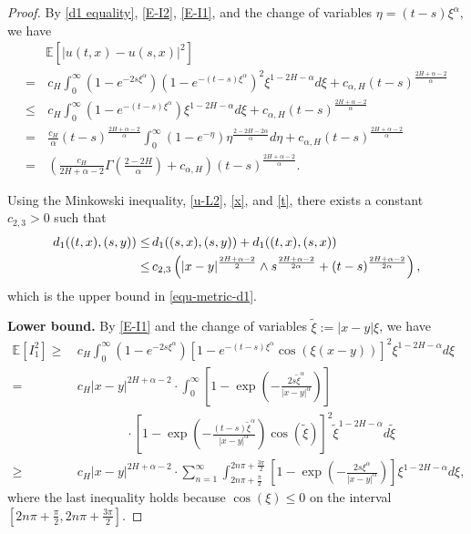 \documentclass[11pt,reqno]{amsart}
\numberwithin{equation}{section}
\def\EE{\mathbb{E}}
\newcommand{\1}{{\bf 1}}
\newcommand{\2}{{\bf 2}}
\newcommand{\lc}{\left(}
\newcommand{\rc}{\right)}
\newcommand{\lk}{\left[}
\newcommand{\rk}{\right]}
\begin{document}
\begin{proof}
By \eqref{d1 equality}, \eqref{E-I2}, \eqref{E-I1}, and
the change of variables $\eta=(t-s)\xi^\alpha$, we have
\begin{equation}\label{t}
\begin{split}
&\EE\left[\left|u(t,x)-u(s,x)\right|^2\right]\\
=&\, c_{H}\int_{0}^{\infty} \lc 1-e^{-2s\xi^{\alpha}}\rc
     \left(1-e^{-(t-s)\xi^{\alpha}}\right)^2   \xi^{1-2H-\alpha}d\xi
     +c_{\alpha, H}(t-s)^{\frac {2H+\alpha-2}{\alpha}} \\
\leq&\, c_{H}\int_{0}^{\infty}\left(1-e^{-(t-s)\xi^{\alpha}}\right)  \xi^{1-2H-\alpha}d\xi
     +c_{\alpha, H}(t-s)^{\frac {2H+\alpha-2}{\alpha}}\\
=&\, \frac{c_{H}}{\alpha}(t-s)^{\frac {2H+\alpha-2}{\alpha}}\int_{0}^{\infty}
     \left(1-e^{-\eta}\right) \eta^{\frac{2-2H-2\alpha}{\alpha}}d\eta
     +c_{\alpha, H}(t-s)^{\frac {2H+\alpha-2}{\alpha}} \\
=&\, \left(\frac{c_{H}}{2H+\alpha-2}\Gamma\left(\frac{2-2H}{\alpha}\right)+c_{\alpha,H}\right)
      (t-s)^{\frac {2H+\alpha-2}{\alpha}}.
\end{split}
\end{equation}

Using the  Minkowski inequality, \eqref{u-L2}, \eqref{x}, and \eqref{t},    there exists a constant $c_{2,3}>0$ such that
\begin{align*}
d_1 ((t,x), (s,y))
\le &\,    d_1 ((s,x), (s,y))+d_1 ((t,x), (s,x))\notag\\
\le &\, c_{2,3}\lc |x-y|^{\frac{2H+\alpha-2}{2}}\wedge s^{\frac{2H+\alpha-2}{2\alpha}}+(t-s)^{\frac{2H+\alpha-2}{2\alpha}}\rc,
\end{align*}
which is the upper bound in  \eqref{equ-metric-d1}.

\noindent
\textbf{Lower bound.}
By \eqref{E-I1} and the change of variables $\tilde{\xi}:=|x-y|\xi$, we have
\begin{equation}\label{I-1}
\begin{split}
\EE\left[I_1^2\right]
\geq&\,  c_{H}\int_{0}^{\infty} \lc 1-e^{-2s\xi^{\alpha}}\rc
       \left[ 1-e^{-(t-s)\xi^{\alpha}}\cos(\xi(x-y))\right]^2   \xi^{1-2H-\alpha}d\xi  \nonumber\\
       =&\,  c_{H}|x-y|^{2H+\alpha-2}  \cdot  \int_{0}^{\infty}\lk 1-\exp\lc-\frac{2s\tilde{\xi}^{\alpha}}{|x-y|^{\alpha}}\rc\rk  \\
   & \ \ \ \ \ \ \ \ \ \ \ \ \ \ \ \ \ \  \cdot \lk 1-\exp\lc-\frac{(t-s)\tilde{\xi}^{\alpha}}{|x-y|^{\alpha}}\rc\cos\left(\tilde{\xi}\right) \rk^2     \tilde{\xi}^{1-2H-\alpha}  d\tilde{\xi}\\
   \geq&\,  c_{H}|x-y|^{2H+\alpha-2}  \cdot   \sum_{n=1}^{\infty}  \int_{2n\pi+\frac{\pi}{2}}^{2n\pi+\frac{3\pi}{2}}  \lk 1-\exp\lc-\frac{2s\xi^{\alpha}}{|x-y|^{\alpha}}\rc\rk  \xi^{1-2H-\alpha}  d\xi,
\end{split}
\end{equation}
where the last inequality holds because   $\cos(\xi)\le 0$  on   the  interval $\left[2n\pi+\frac{\pi}{2},2n\pi+\frac{3\pi}{2}\right]$.


\end{proof}
\end{document}
